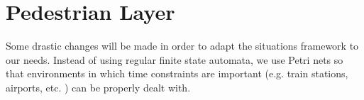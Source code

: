 \documentclass[11pt]{book}
\begin{document}

\section{Pedestrian Layer}
Some drastic changes will be made in order to adapt the situations framework to our needs. Instead of using regular finite state automata, we use Petri nets so that environments in which time constraints are important (e.g. train stations, airports, etc. ) can be properly dealt with.


\end{document}
